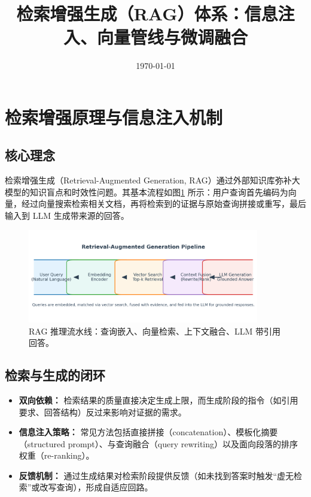 \documentclass[UTF8,zihao=-4]{ctexart}
\title{检索增强生成（RAG）体系：信息注入、向量管线与微调融合}
\author{}
\date{\today}
\begin{document}
\maketitle

\section{检索增强原理与信息注入机制}
\subsection{核心理念}
检索增强生成（Retrieval-Augmented Generation, RAG）通过外部知识库弥补大模型的知识盲点和时效性问题。其基本流程如图\ref{fig:rag_pipeline_cn} 所示：用户查询首先编码为向量，经过向量搜索检索相关文档，再将检索到的证据与原始查询拼接或重写，最后输入到 LLM 生成带来源的回答。
\begin{figure}[H]
  \centering
  \includegraphics[width=0.9\textwidth]{rag_pipeline.png}
  \caption{RAG 推理流水线：查询嵌入、向量检索、上下文融合、LLM 带引用回答。}
  \label{fig:rag_pipeline_cn}
\end{figure}

\subsection{检索与生成的闭环}
\begin{itemize}
  \item \textbf{双向依赖：} 检索结果的质量直接决定生成上限，而生成阶段的指令（如引用要求、回答结构）反过来影响对证据的需求。
  \item \textbf{信息注入策略：} 常见方法包括直接拼接（concatenation）、模板化摘要（structured prompt）、与查询融合（query rewriting）以及面向段落的排序权重（re-ranking）。
  \item \textbf{反馈机制：} 通过生成结果对检索阶段提供反馈（如未找到答案时触发“虚无检索”或改写查询），形成自适应回路。
\end{itemize}
\end{document}
